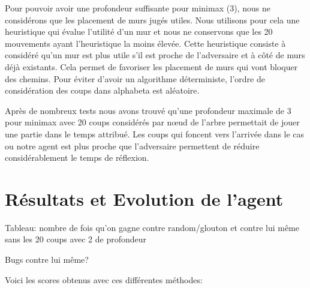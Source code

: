 \documentclass[12pt]{article}
\begin{document}
Pour pouvoir avoir une profondeur suffisante pour minimax (3), nous ne considérons que les placement de murs jugés utiles. Nous utilisons pour cela une heuristique qui évalue l'utilité d'un mur et nous ne conservons que les 20 mouvements ayant l'heuristique la moins élevée. Cette heuristique consiste à considéré qu'un mur est plus utile s'il est proche de l'adversaire et à côté de murs déjà existants. Cela permet de favoriser les placement de murs qui vont bloquer des chemins. Pour éviter d'avoir un algorithme déterministe, l'ordre de considération des coups dans alphabeta est aléatoire. 

Après de nombreux tests nous avons trouvé qu'une profondeur maximale de 3 pour minimax avec 20 coups considérés par nœud de l'arbre permettait de jouer une partie dans le temps attribué. Les coups qui foncent vers l'arrivée dans le cas ou notre agent est plus proche que l'adversaire permettent de réduire considérablement le temps de réflexion. 

\section*{Résultats et Evolution de l'agent}

Tableau: nombre de fois qu'on gagne contre random/glouton et contre lui même sans les 20 coups avec 2 de profondeur

Bugs contre lui même?

Voici les scores obtenus avec ces différentes méthodes:
\end{document}
